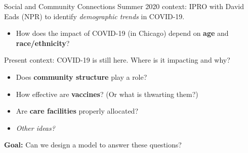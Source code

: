 \begin{slide}{Social and Community Connections}
	{\large Summer 2020 context:} IPRO with David Eads (NPR) to identify \textit{demographic trends} in COVID-19. \\
	
	\vspace{.2cm}
	
	\begin{itemize}
		\item How does the impact of COVID-19 (in Chicago) depend on \textbf{age} and \textbf{race/ethnicity}?
	\end{itemize}
	
	\vspace{1cm}
	
	{\large Present context:} COVID-19 is still here. Where is it impacting and why?
	
	\vspace{.2cm}
	
	\begin{itemize}
		\item Does \textbf{community structure} play a role?
		\item How effective are \textbf{vaccines}? (Or what is thwarting them?)
		\item Are \textbf{care facilities} properly allocated?
		\item \emph{Other ideas?}
	\end{itemize}

	\vspace{.7cm}
	
	{\large \textbf{Goal:} Can we design a model to answer these questions?}
\end{slide}